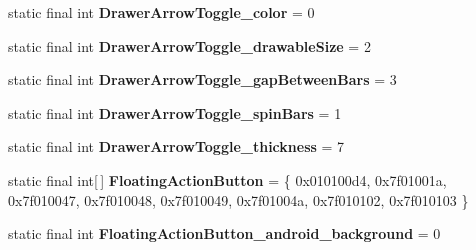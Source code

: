 \begin{DoxyCompactItemize}
\item 
\hypertarget{classandroid_1_1support_1_1design_1_1_r_1_1styleable_ac4d5211c86d092042a0345825deae18b}{}static final int {\bfseries Drawer\+Arrow\+Toggle\+\_\+color} = 0\label{classandroid_1_1support_1_1design_1_1_r_1_1styleable_ac4d5211c86d092042a0345825deae18b}

\item 
\hypertarget{classandroid_1_1support_1_1design_1_1_r_1_1styleable_a0cf8966074e0de6dde7fa5cfec03d99e}{}static final int {\bfseries Drawer\+Arrow\+Toggle\+\_\+drawable\+Size} = 2\label{classandroid_1_1support_1_1design_1_1_r_1_1styleable_a0cf8966074e0de6dde7fa5cfec03d99e}

\item 
\hypertarget{classandroid_1_1support_1_1design_1_1_r_1_1styleable_a2ae57027db3b52747cd4fe6891be50ae}{}static final int {\bfseries Drawer\+Arrow\+Toggle\+\_\+gap\+Between\+Bars} = 3\label{classandroid_1_1support_1_1design_1_1_r_1_1styleable_a2ae57027db3b52747cd4fe6891be50ae}

\item 
\hypertarget{classandroid_1_1support_1_1design_1_1_r_1_1styleable_a192aaf9e5f494152409e8bd792ca49e6}{}static final int {\bfseries Drawer\+Arrow\+Toggle\+\_\+spin\+Bars} = 1\label{classandroid_1_1support_1_1design_1_1_r_1_1styleable_a192aaf9e5f494152409e8bd792ca49e6}

\item 
\hypertarget{classandroid_1_1support_1_1design_1_1_r_1_1styleable_a3ad2ad7d27382bb2a96f303bef508661}{}static final int {\bfseries Drawer\+Arrow\+Toggle\+\_\+thickness} = 7\label{classandroid_1_1support_1_1design_1_1_r_1_1styleable_a3ad2ad7d27382bb2a96f303bef508661}

\item 
\hypertarget{classandroid_1_1support_1_1design_1_1_r_1_1styleable_ac39eabec239d50ec950ae5f013825830}{}static final int\mbox{[}$\,$\mbox{]} {\bfseries Floating\+Action\+Button} = \{ 0x010100d4, 0x7f01001a, 0x7f010047, 0x7f010048, 0x7f010049, 0x7f01004a, 0x7f010102, 0x7f010103 \}\label{classandroid_1_1support_1_1design_1_1_r_1_1styleable_ac39eabec239d50ec950ae5f013825830}

\item 
\hypertarget{classandroid_1_1support_1_1design_1_1_r_1_1styleable_ac924fa64caeaf10281ed9453d78eea80}{}static final int {\bfseries Floating\+Action\+Button\+\_\+android\+\_\+background} = 0\label{classandroid_1_1support_1_1design_1_1_r_1_1styleable_ac924fa64caeaf10281ed9453d78eea80}


\end{DoxyCompactItemize}
